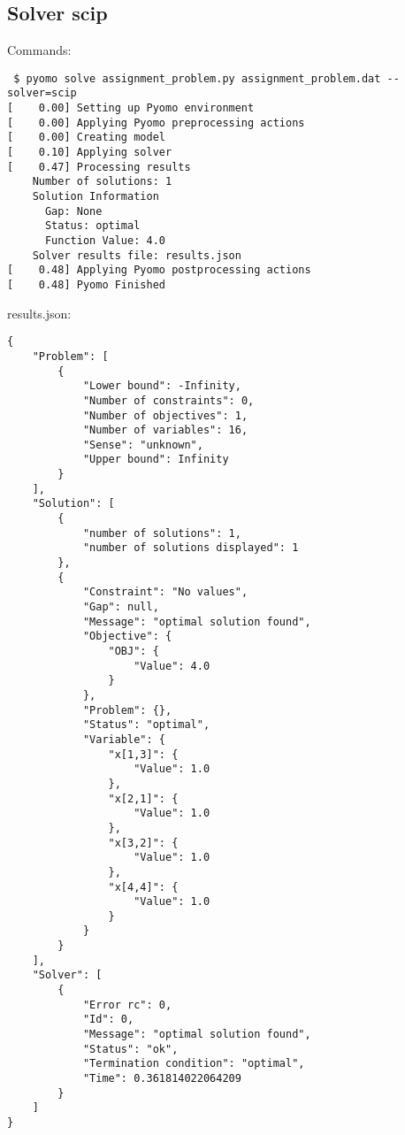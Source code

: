 \documentclass[a4paper]{article}
\begin{document}
\subsection*{Solver scip}
Commands:
\begin{verbatim}
 $ pyomo solve assignment_problem.py assignment_problem.dat --solver=scip
[    0.00] Setting up Pyomo environment
[    0.00] Applying Pyomo preprocessing actions
[    0.00] Creating model
[    0.10] Applying solver
[    0.47] Processing results
    Number of solutions: 1
    Solution Information
      Gap: None
      Status: optimal
      Function Value: 4.0
    Solver results file: results.json
[    0.48] Applying Pyomo postprocessing actions
[    0.48] Pyomo Finished
\end{verbatim}
results.json:
\begin{verbatim}
{
    "Problem": [
        {
            "Lower bound": -Infinity, 
            "Number of constraints": 0, 
            "Number of objectives": 1, 
            "Number of variables": 16, 
            "Sense": "unknown", 
            "Upper bound": Infinity
        }
    ], 
    "Solution": [
        {
            "number of solutions": 1, 
            "number of solutions displayed": 1
        }, 
        {
            "Constraint": "No values", 
            "Gap": null, 
            "Message": "optimal solution found", 
            "Objective": {
                "OBJ": {
                    "Value": 4.0
                }
            }, 
            "Problem": {}, 
            "Status": "optimal", 
            "Variable": {
                "x[1,3]": {
                    "Value": 1.0
                }, 
                "x[2,1]": {
                    "Value": 1.0
                }, 
                "x[3,2]": {
                    "Value": 1.0
                }, 
                "x[4,4]": {
                    "Value": 1.0
                }
            }
        }
    ], 
    "Solver": [
        {
            "Error rc": 0, 
            "Id": 0, 
            "Message": "optimal solution found", 
            "Status": "ok", 
            "Termination condition": "optimal", 
            "Time": 0.361814022064209
        }
    ]
}\end{verbatim}

\end{document}
